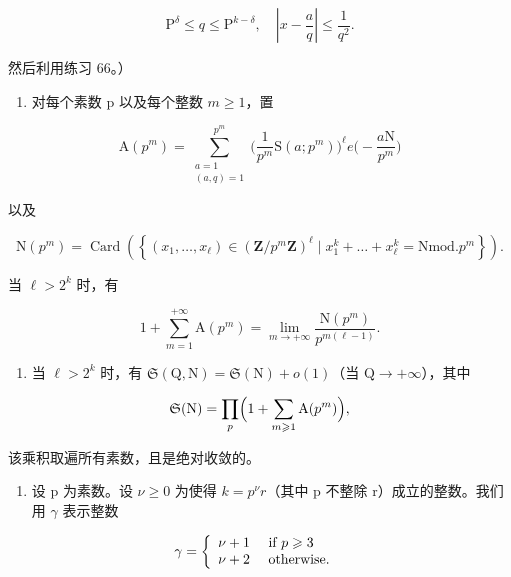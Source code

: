\[
\mathrm{P} ^ {\delta} \leqslant q \leqslant \mathrm{P} ^ {k - \delta}, \quad \left| x - \frac {a}{q} \right| \leqslant \frac {1}{q ^ {2}}.
\]

然后利用练习 66。）

\begin{enumerate}
\def\labelenumi{\alph{enumi})}
\setcounter{enumi}{5}
\tightlist
\item
  对每个素数 p 以及每个整数 \(m \geqslant 1\)，置
\end{enumerate}

\[
\mathrm{A}(p^{m}) = \sum_{\substack{a = 1\\ (a,q) = 1}}^{p^{m}}\Big(\frac{1}{p^{m}}\mathrm{S}(a;p^{m})\Big)^{\ell}e\Big(-\frac{a\mathrm{N}}{p^{m}}\Big)
\]

以及

\[
\mathrm{N} (p ^ {m}) = \operatorname{Card} \left(\left\{\left(x _ {1}, \dots , x _ {\ell}\right) \in (\mathbf {Z} / p ^ {m} \mathbf {Z}) ^ {\ell} \mid x _ {1} ^ {k} + \dots + x _ {\ell} ^ {k} = \mathrm{N mod.} p ^ {m} \right\}\right).
\]

当 \(\ell > 2^k\) 时，有

\[
1 + \sum_ {m = 1} ^ {+ \infty} \mathrm{A} (p ^ {m}) = \lim _ {m \to + \infty} \frac {\mathrm{N} (p ^ {m})}{p ^ {m (\ell - 1)}}.
\]

\begin{enumerate}
\def\labelenumi{\alph{enumi})}
\setcounter{enumi}{6}
\tightlist
\item
  当 \(\ell > 2^k\) 时，有 \(\mathfrak{S}(\mathrm{Q}, \mathrm{N}) = \mathfrak{S}(\mathrm{N}) + o(1)\)（当 \(\mathrm{Q} \to +\infty\)），其中
\end{enumerate}

\[
\mathfrak {S} (\mathrm{N}) = \prod_ {p} \Bigl (1 + \sum_ {m \geqslant 1} \mathrm{A} (p ^ {m}) \Bigr),
\]

该乘积取遍所有素数，且是绝对收敛的。

\begin{enumerate}
\def\labelenumi{\alph{enumi})}
\setcounter{enumi}{7}
\tightlist
\item
  设 p 为素数。设 \(\nu \geqslant 0\) 为使得 \(k = p^{\nu}r\)（其中 p 不整除 r）成立的整数。我们用 \(\gamma\) 表示整数
\end{enumerate}

\[
\gamma = \left\{ \begin{array}{l l} \nu + 1 & \text { if } p \geqslant 3 \\ \nu + 2 & \text { otherwise. } \end{array} \right.
\]

